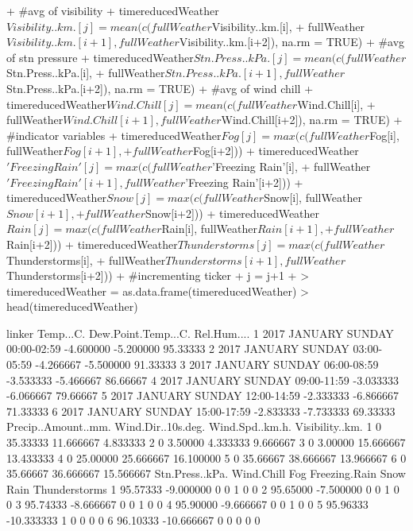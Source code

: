 \documentclass[11pt, a4paper]{article}
\begin{document}
\begin{Schunk}
\begin{Sinput}
{+   #avg of visibility
+   timereducedWeather$Visibility..km.[j] = mean(c(fullWeather$Visibility..km.[i],
+     fullWeather$Visibility..km.[i+1], fullWeather$Visibility..km.[i+2]), na.rm = TRUE)
+   #avg of stn pressure
+   timereducedWeather$Stn.Press..kPa.[j] = mean(c(fullWeather$Stn.Press..kPa.[i],
+     fullWeather$Stn.Press..kPa.[i+1], fullWeather$Stn.Press..kPa.[i+2]), na.rm = TRUE)
+   #avg of wind chill
+   timereducedWeather$Wind.Chill[j] = mean(c(fullWeather$Wind.Chill[i],
+     fullWeather$Wind.Chill[i+1], fullWeather$Wind.Chill[i+2]), na.rm = TRUE)
+   #indicator variables
+   timereducedWeather$Fog[j] = max(c(fullWeather$Fog[i], fullWeather$Fog[i+1], 
+                             fullWeather$Fog[i+2]))
+   timereducedWeather$'Freezing Rain'[j] = max(c(fullWeather$'Freezing Rain'[i], 
+         fullWeather$'Freezing Rain'[i+1], fullWeather$'Freezing Rain'[i+2]))
+   timereducedWeather$Snow[j] = max(c(fullWeather$Snow[i], fullWeather$Snow[i+1], 
+                             fullWeather$Snow[i+2]))
+   timereducedWeather$Rain[j] = max(c(fullWeather$Rain[i], fullWeather$Rain[i+1], 
+                             fullWeather$Rain[i+2]))
+   timereducedWeather$Thunderstorms[j] = max(c(fullWeather$Thunderstorms[i], 
+         fullWeather$Thunderstorms[i+1], fullWeather$Thunderstorms[i+2]))
+   #incrementing ticker
+   j = j+1
+ }
> timereducedWeather = as.data.frame(timereducedWeather)
> head(timereducedWeather)
\end{Sinput}
\begin{Soutput}
                           linker Temp...C. Dew.Point.Temp...C. Rel.Hum....
1 2017 JANUARY SUNDAY 00:00-02:59 -4.600000           -5.200000    95.33333
2 2017 JANUARY SUNDAY 03:00-05:59 -4.266667           -5.500000    91.33333
3 2017 JANUARY SUNDAY 06:00-08:59 -3.533333           -5.466667    86.66667
4 2017 JANUARY SUNDAY 09:00-11:59 -3.033333           -6.066667    79.66667
5 2017 JANUARY SUNDAY 12:00-14:59 -2.333333           -6.866667    71.33333
6 2017 JANUARY SUNDAY 15:00-17:59 -2.833333           -7.733333    69.33333
  Precip..Amount..mm. Wind.Dir..10s.deg. Wind.Spd..km.h. Visibility..km.
1                   0           35.33333       11.666667        4.833333
2                   0            3.50000        4.333333        9.666667
3                   0            3.00000       15.666667       13.433333
4                   0           25.00000       25.666667       16.100000
5                   0           35.66667       38.666667       13.966667
6                   0           35.66667       36.666667       15.566667
  Stn.Press..kPa. Wind.Chill Fog Freezing.Rain Snow Rain Thunderstorms
1        95.57333  -9.000000   0             0    1    0             0
2        95.65000  -7.500000   0             0    1    0             0
3        95.74333  -8.666667   0             0    1    0             0
4        95.90000  -9.666667   0             0    1    0             0
5        95.96333 -10.333333   1             0    0    0             0
6        96.10333 -10.666667   0             0    0    0             0
\end{Soutput}
\end{Schunk}
\end{document}
